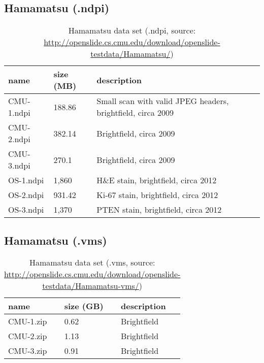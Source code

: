 \subsection{Hamamatsu (.ndpi)}
\label{secA_Hama}

\begin{table}[H]
	\begin{center}
		\begin{tabular}{| p{4cm} | p{2cm} | p{5cm} |}
			\hline
			\textbf{name} & \textbf{size (MB)} & \textbf{description} \\ \hline
			CMU-1.ndpi & 188.86 & Small scan with valid JPEG headers, brightfield, circa 2009 \\ \hline
			CMU-2.ndpi & 382.14 & Brightfield, circa 2009 \\ \hline
			CMU-3.ndpi & 270.1 & Brightfield, circa 2009 \\ \hline
			OS-1.ndpi & 1,860 & H\&E stain, brightfield, circa 2012 \\ \hline
			OS-2.ndpi & 931.42 & Ki-67 stain, brightfield, circa 2012 \\ \hline
			OS-3.ndpi & 1,370 & PTEN stain, brightfield, circa 2012 \\ \hline
		\end{tabular}
		\caption{Hamamatsu data set (.ndpi, source: \url{http://openslide.cs.cmu.edu/download/openslide-testdata/Hamamatsu/})}
	\end{center}
\end{table}


\subsection{Hamamatsu (.vms)}

\begin{table}[H]
	\begin{center}
		\begin{tabular}{| p{4cm} | p{2cm} | p{5cm} |}
			\hline
			\textbf{name} & \textbf{size (GB)} & \textbf{description} \\ \hline
			CMU-1.zip & 0.62 & Brightfield \\ \hline
			CMU-2.zip & 1.13 & Brightfield \\ \hline
			CMU-3.zip & 0.91 & Brightfield \\ \hline
		\end{tabular}
		\caption{Hamamatsu data set (.vms, source: \url{http://openslide.cs.cmu.edu/download/openslide-testdata/Hamamatsu-vms/})}
	\end{center}
\end{table}


